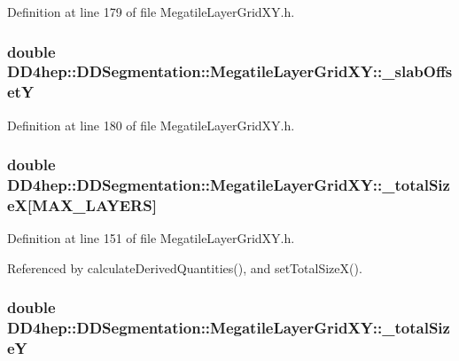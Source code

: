Definition at line 179 of file MegatileLayerGridXY.h.\hypertarget{class_d_d4hep_1_1_d_d_segmentation_1_1_megatile_layer_grid_x_y_a61ef3df26e0b23cef4750bcdb597c88f}{
\subsubsection[{\_\-slabOffsetY}]{\setlength{\rightskip}{0pt plus 5cm}double {\bf DD4hep::DDSegmentation::MegatileLayerGridXY::\_\-slabOffsetY}}}
\label{class_d_d4hep_1_1_d_d_segmentation_1_1_megatile_layer_grid_x_y_a61ef3df26e0b23cef4750bcdb597c88f}


Definition at line 180 of file MegatileLayerGridXY.h.\hypertarget{class_d_d4hep_1_1_d_d_segmentation_1_1_megatile_layer_grid_x_y_aa99372ea774b35c1c17cee61d9afbef2}{
\subsubsection[{\_\-totalSizeX}]{\setlength{\rightskip}{0pt plus 5cm}double {\bf DD4hep::DDSegmentation::MegatileLayerGridXY::\_\-totalSizeX}\mbox{[}MAX\_\-LAYERS\mbox{]}}}
\label{class_d_d4hep_1_1_d_d_segmentation_1_1_megatile_layer_grid_x_y_aa99372ea774b35c1c17cee61d9afbef2}


Definition at line 151 of file MegatileLayerGridXY.h.

Referenced by calculateDerivedQuantities(), and setTotalSizeX().\hypertarget{class_d_d4hep_1_1_d_d_segmentation_1_1_megatile_layer_grid_x_y_a872eaf618286c808f1cb93e7756a6c7c}{
\subsubsection[{\_\-totalSizeY}]{\setlength{\rightskip}{0pt plus 5cm}double {\bf DD4hep::DDSegmentation::MegatileLayerGridXY::\_\-totalSizeY}}}
\label{class_d_d4hep_1_1_d_d_segmentation_1_1_megatile_layer_grid_x_y_a872eaf618286c808f1cb93e7756a6c7c}


